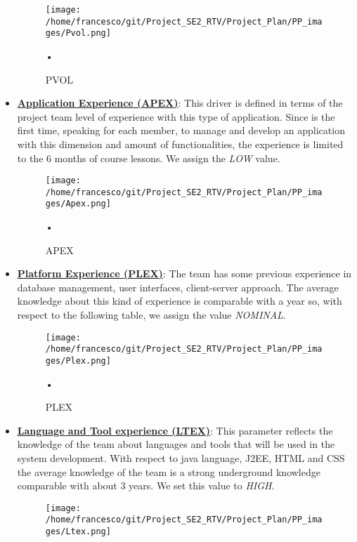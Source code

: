 \documentclass[10pt, a4paper,titlepage]{article}
\begin{document}
\begin{itemize}
\begin{figure}[h]
\begin{center}
\texttt{[image: /home/francesco/git/Project\_SE2\_RTV/Project\_Plan/PP\_images/Pvol.png]}
\caption{PVOL}
\label{fig:PVOL}
\end{center}•
\end{figure}
\linebreak
\item \underline{\textbf{Application Experience (APEX)}}: This driver is defined in terms of the project team level of experience with this type of application. Since is the first time, speaking for each member, to manage and develop an application with this dimension and amount of functionalities, the experience is limited to the 6 months of course lessons. We assign the \emph{LOW} value.
\begin{figure}[h]
\begin{center}
\texttt{[image: /home/francesco/git/Project\_SE2\_RTV/Project\_Plan/PP\_images/Apex.png]}
\caption{APEX}
\label{fig:APEX}
\end{center}•
\end{figure}
\linebreak
\item \underline{\textbf{Platform Experience (PLEX)}}: The team has some previous experience in database management, user interfaces, client-server approach. The average knowledge about this kind of experience is comparable with a year so, with respect to the following table, we assign the value \emph{NOMINAL}.
\begin{figure}[h]
\begin{center}
\texttt{[image: /home/francesco/git/Project\_SE2\_RTV/Project\_Plan/PP\_images/Plex.png]}
\caption{PLEX}
\label{fig:PLEX}
\end{center}•
\end{figure}
\pagebreak
\item \underline{\textbf{Language and Tool experience (LTEX)}}: This parameter reflects the knowledge of the team about languages and tools that will be used in the system development. With respect to java language, J2EE, HTML and CSS the average knowledge of the team is a strong underground knowledge comparable with about 3 years. We set this value to \emph{HIGH}.
\begin{figure}[h]
\begin{center}
\texttt{[image: /home/francesco/git/Project\_SE2\_RTV/Project\_Plan/PP\_images/Ltex.png]}

\end{center}
\end{figure}
\end{itemize}
\end{document}

